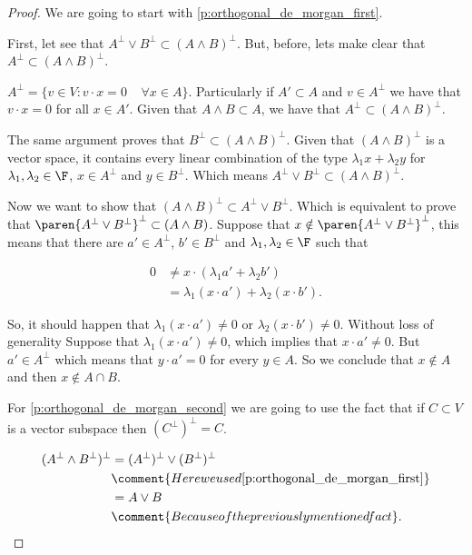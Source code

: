 \begin{proof}
    We are going to start with \eqref{p:orthogonal_de_morgan_first}.\pn
    
    First, let see that $A^\perp \vee B^\perp \subset (A \wedge B)^\perp$. But, before, lets make clear that
    $A^\perp \subset (A \wedge B)^\perp$.\pn
    
    $A^\perp = \{ v \in V : v \cdot x = 0 \;\;\;\; \forall x \in A \}$. Particularly if $A' \subset A$ and $v \in A^\perp$
    we have that $v \cdot x = 0$ for all $x \in A'$. Given that $A \wedge B \subset A$, we have that $A^\perp \subset (A \wedge B)^\perp$.\pn
    
    The same argument proves that $B^\perp \subset (A \wedge B)^\perp$. Given that $(A \wedge B)^\perp$ is a vector space,
    it contains every linear combination of the type $\lambda_1 x + \lambda_2 y$ for $\lambda_1, \lambda_2 \in \F$, $x \in A^\perp$ and
    $y \in B^\perp$. Which means $A^\perp \vee B^\perp \subset (A \wedge B)^\perp$.\pn
    
    Now we want to show that $(A \wedge B)^\perp \subset A^\perp \vee B^\perp$. Which is equivalent to prove that 
    $\paren{A^\perp \vee B^\perp}^{\perp} \subset (A \wedge B)$. Suppose that $x \notin \paren{A^\perp \vee B^\perp}^{\perp}$, 
    this means that there are $a' \in A^\perp$, $b' \in B^\perp$ and $\lambda_1, \lambda_2 \in \F$ such that
    
    \begin{align}
        0   &\neq   x \cdot (\lambda_1 a' + \lambda_2 b')           \\
            &=      \lambda_1 (x \cdot a') + \lambda_2 (x \cdot b').
    \end{align}\pn
    
    So, it should happen that $\lambda_1 (x \cdot a') \neq 0$ or $\lambda_2 (x \cdot b') \neq 0$. Without loss of generality Suppose that
    $\lambda_1 (x \cdot a') \neq 0$, which implies that $x \cdot a' \neq 0$. But $a' \in A^\perp$ which means that $y \cdot a' = 0$ for
    every $y \in A$. So we conclude that $x \notin A$ and then $x \notin A \cap B$.\pn
    
    For \eqref{p:orthogonal_de_morgan_second} we are going to use the fact that if $C \subset V$ is a vector subspace then
    $(C^\perp)^\perp = C$.
    
    \begin{align}
        (A^\perp \wedge B^\perp)^\perp  &=  (A^\perp)^\perp \vee (B^\perp)^\perp                            \\
                                        &\comment{Here we used \eqref{p:orthogonal_de_morgan_first}}        \\
                                        &=  A \vee B                                                        \\
                                        &\comment{Because of the previously mentioned fact}.
    \end{align}\pn
    

\end{proof}

